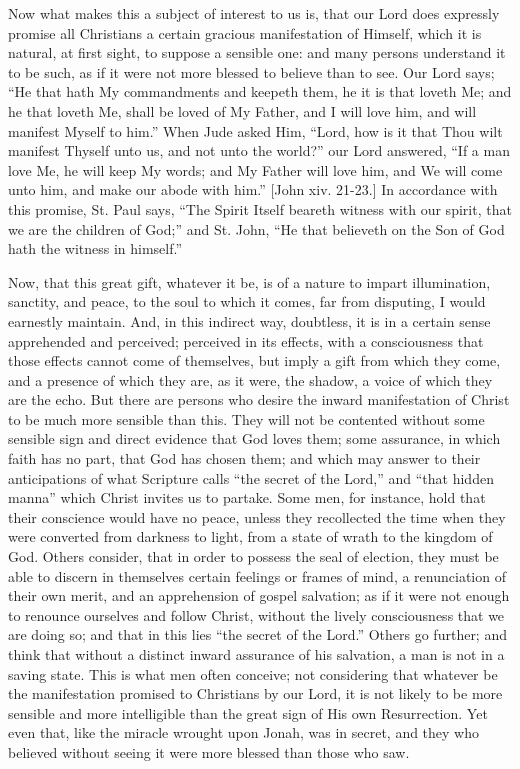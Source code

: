 Now what makes this a subject of interest to us is, that our Lord
does expressly promise all Christians a certain gracious manifestation
of Himself, which it is natural, at first sight, to suppose a sensible
one: and many persons understand it to be such, as if it were not more
blessed to believe than to see. Our Lord says; ``He that hath My
commandments and keepeth them, he it is that loveth Me; and he that
loveth Me, shall be loved of My Father, and I will love him, and will
manifest Myself to him.'' When Jude asked Him, ``Lord, how is it
that Thou wilt manifest Thyself unto us, and not unto the world?''
our Lord answered, ``If a man love Me, he will keep My words; and My
Father will love him, and We will come unto him, and make our abode with
him.'' [John xiv. 21-23.] In accordance with this promise, St. Paul
says, ``The Spirit Itself beareth witness with our spirit, that we
are the children of God;'' and St. John, ``He that believeth on
the Son of God hath the witness in himself.''

Now, that this great gift, whatever it be, is of a nature to impart
illumination, sanctity, and peace, to the soul to which it comes, far
from disputing, I would earnestly maintain. And, in this indirect way,
doubtless, it is in a certain sense apprehended and perceived; perceived
in its effects, with a consciousness that those effects cannot come of
themselves, but imply a gift from which they come, and a presence of
which they are, as it were, the shadow, a voice of which they are the
echo. But there are persons who desire the inward manifestation of
Christ to be much more sensible than this. They will not be contented
without some sensible sign and direct evidence that God loves them; some
assurance, in which faith has no part, that God has chosen them; and
which may answer to their anticipations of what Scripture calls
``the secret of the Lord,'' and ``that hidden manna''
which Christ invites us to partake. Some men, for instance, hold that
their conscience would have no peace, unless they recollected the time
when they were converted from darkness to light, from a state of wrath
to the kingdom of God. Others consider, that in order to possess the
seal of election, they must be able to discern in themselves certain
feelings or frames of mind, a renunciation of their own merit, and an
apprehension of gospel salvation; as if it were not enough to renounce
ourselves and follow Christ, without the lively consciousness that we
are doing so; and that in this lies ``the secret of the Lord.''
Others go further; and think that without a distinct inward assurance of
his salvation, a man is not in a saving state. This is what men often
conceive; not considering that whatever be the manifestation promised to
Christians by our Lord, it is not likely to be more sensible and more
intelligible than the great sign of His own Resurrection. Yet even that,
like the miracle wrought upon Jonah, was in secret, and they who
believed without seeing it were more blessed than those who saw.

